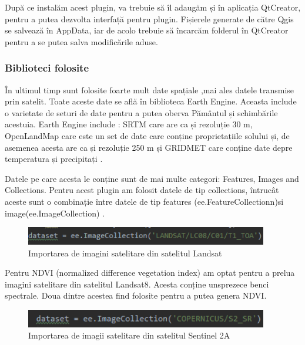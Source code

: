 \documentclass[12pt,a4paper]{article}
\theoremstyle{definition}
\theoremstyle{remark}
\begin{document}
După ce instalăm acest plugin, va trebuie să îl adaugăm și în aplicația QtCreator, pentru a putea dezvolta interfață pentru plugin. Fișierele generate de către Qgis se salvează în AppData, iar de acolo trebuie să încarcăm folderul în QtCreator pentru a se putea salva modificările aduse.




\subsubsection{Biblioteci folosite}

În ultimul timp sunt folosite foarte mult date spațiale ,mai ales datele transmise prin satelit. Toate aceste date se află în biblioteca Earth Engine. Aceasta include o varietate de seturi de date pentru a putea oberva Pământul și schimbările acestuia. Earth Engine include : SRTM care are ca și rezoluție 30 m,
OpenLandMap care este un  set de date care conține proprietațiile solului și, de asemenea acesta are ca și rezoluție 250 m și GRIDMET care conține date depre temperatura și precipitați \cite{ee}.

Datele pe care acesta le conține sunt de mai multe categori: Features, Images and Collections. Pentru acest plugin am folosit datele de tip collections, întrucât aceste sunt o combinație între datele de tip features (ee.FeatureCollectionn)si  image(ee.ImageCollection) \cite{ee}.

\begin{figure}[H]
  \centering
  \includegraphics[width=300pt]{landsat.PNG}
  \caption{Importarea de imagini satelitare din satelitul Landsat}   
\end{figure}

Pentru NDVI (normalized difference vegetation index) am optat pentru a prelua imagini satelitare din satelitul Landsat8. Acesta conține unsprezece benci spectrale. Doua dintre acestea find folosite pentru a putea genera NDVI.

\begin{figure}[H]
  \centering
  \includegraphics[width=300pt]{sentinel.PNG}
  \caption{Importarea de imagii satelitare din satelitul Sentinel 2A}   
\end{figure}
\end{document}
